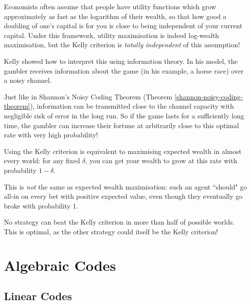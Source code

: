 \documentclass{article}
\begin{document}
\begin{note}
	Economists often assume that people have utility functions which grow approximately as fast as the logarithm of their wealth, so that how good a doubling of one's capital is for you is close to being independent of your current capital. Under this framework, utility maximisation is indeed log-wealth maximisation, but the Kelly criterion is \textit{totally independent} of this assumption!
\end{note}

Kelly showed how to interpret this using information theory.
In his model, the gambler receives information about the game
(in his example, a horse race) over a noisy channel.

Just like in Shannon's Noisy Coding Theorem
(Theorem \ref{shannon-noisy-coding-theorem}),
information can be transmitted close to the channel capacity
with negligible risk of error in the long run. So if the game lasts for a sufficiently long time, the gambler can increase their fortune at arbitrarily close to this optimal rate with very high probability!

\begin{corollary}
    Using the Kelly criterion is equivalent to maximising expected wealth in almost every world: for any fixed $\delta$, you can get your wealth to grow at this rate with probability $1-\delta$.
\end{corollary}

\begin{note}
	This is \textit{not} the same as expected wealth maximisation: such an agent ``should" go all-in on every bet with positive expected value, even though they eventually go broke with probability 1.
\end{note}

\begin{corollary}
    No strategy can beat the Kelly criterion in more than half of possible worlds. This is optimal, as the other strategy could itself be the Kelly criterion!
\end{corollary}


\pagebreak
\section{Algebraic Codes}
\subsection{Linear Codes}
\label{section-algebraic-linear-codes}
\end{document}
